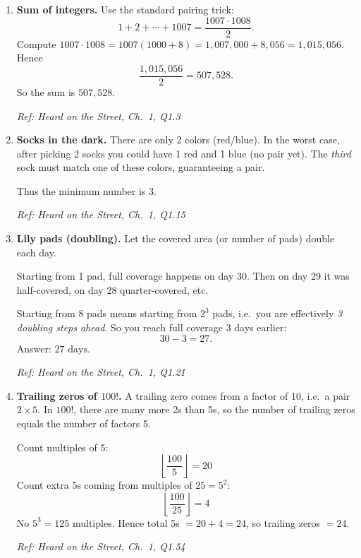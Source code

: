 \documentclass[11pt]{article}
\begin{document}
\begin{enumerate}[label=\textbf{\arabic*.}]
\hfill{\small\textit{Ref: Heard on the Street, Ch.\ 1, Q1.2}}

\item \textbf{Sum of integers.}
Use the standard pairing trick:
\[
1+2+\cdots+1007=\frac{1007\cdot 1008}{2}.
\]
Compute \(1007\cdot 1008=1007(1000+8)=1{,}007{,}000+8{,}056=1{,}015{,}056\). Hence
\[
\frac{1{,}015{,}056}{2}=507{,}528.
\]
So the sum is \(\boxed{507{,}528}\).

\hfill{\small\textit{Ref: Heard on the Street, Ch.\ 1, Q1.3}}

\item \textbf{Socks in the dark.}
There are only 2 colors (red/blue). In the worst case, after picking 2 socks you could have 1 red and 1 blue (no pair yet).
The \emph{third} sock must match one of these colors, guaranteeing a pair.

Thus the minimum number is \(\boxed{3}\).

\hfill{\small\textit{Ref: Heard on the Street, Ch.\ 1, Q1.15}}

\item \textbf{Lily pads (doubling).}
Let the covered area (or number of pads) double each day.

Starting from 1 pad, full coverage happens on day 30. Then on day 29 it was half-covered, on day 28 quarter-covered, etc.

Starting from 8 pads means starting from \(2^3\) pads, i.e.\ you are effectively \emph{3 doubling steps ahead}.
So you reach full coverage 3 days earlier:
\[
30-3=27.
\]
Answer: \(\boxed{27\text{ days}}\).

\hfill{\small\textit{Ref: Heard on the Street, Ch.\ 1, Q1.21}}

\item \textbf{Trailing zeros of \(100!\).}
A trailing zero comes from a factor of 10, i.e.\ a pair \(2\times 5\).
In \(100!\), there are many more 2s than 5s, so the number of trailing zeros equals the number of factors 5.

Count multiples of 5:
\[
\left\lfloor \frac{100}{5}\right\rfloor=20
\]
Count extra 5s coming from multiples of \(25=5^2\):
\[
\left\lfloor \frac{100}{25}\right\rfloor=4
\]
No \(5^3=125\) multiples.
Hence total 5s \(=20+4=24\), so trailing zeros \(=\boxed{24}\).

\hfill{\small\textit{Ref: Heard on the Street, Ch.\ 1, Q1.54}}


\end{enumerate}
\end{document}
